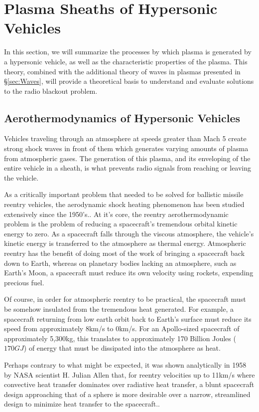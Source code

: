 \documentclass[twocolumn]{article}
\begin{document}
\section{Plasma Sheaths of Hypersonic Vehicles} \label{sec:PlasmaSheaths}
In this section, we will summarize the processes by which plasma is generated by a hypersonic vehicle, as well as the characteristic properties of the plasma.
This theory, combined with the additional theory of waves in plasmas presented in \S\ref{sec:Waves}, will provide a theoretical basis to understand and evaluate solutions to the radio blackout problem.

\subsection*{Aerothermodynamics of Hypersonic Vehicles}
Vehicles traveling through an atmosphere at speeds greater than Mach 5 create strong shock waves in front of them which generates varying amounts of plasma from atmospheric gases.
The generation of this plasma, and its enveloping of the entire vehicle in a sheath, is what prevents radio signals from reaching or leaving the vehicle.

As a critically important problem that needed to be solved for ballistic missile reentry vehicles, the aerodynamic shock heating phenomenon has been studied extensively since the 1950's.\cite{allen_study_1958}\cite{dunn_theoretical_1973}\cite{allen_aerodynamic_1964}\cite{launius_coming_2012}.
At it's core, the reentry aerothermodynamic problem is the problem of reducing a spacecraft's tremendous orbital kinetic energy to zero.
As a spacecraft falls through the viscous atmosphere, the vehicle's kinetic energy is transferred to the atmosphere as thermal energy.
Atmospheric reentry has the benefit of doing most of the work of bringing a spacecraft back down to Earth, whereas on planetary bodies lacking an atmosphere, such as Earth's Moon, a spacecraft must reduce its own velocity using rockets, expending precious fuel.

Of course, in order for atmospheric reentry to be practical, the spacecraft must be somehow insulated from the tremendous heat generated.
For example, a spacecraft returning from low earth orbit back to Earth's surface must reduce its speed from approximately 8km/s to 0km/s.
For an Apollo-sized spacecraft of approximately 5,300kg, this translates to approximately 170 Billion Joules ($170GJ$) of energy that must be dissipated into the atmosphere as heat.

Perhaps contrary to what might be expected, it was shown analytically in 1958 by NASA scientist H. Julian Allen that, for reentry velocities up to 11km/s where convective heat transfer dominates over radiative heat transfer, a blunt spacecraft design approaching that of a sphere is more desirable over a narrow, streamlined design to minimize heat transfer to the spacecraft.\cite{allen_study_1958}\cite{allen_aerodynamic_1964}.
\end{document}
